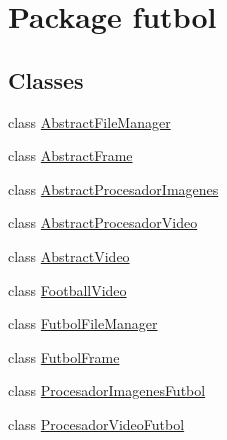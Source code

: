 \hypertarget{namespacefutbol}{}\section{Package futbol}
\label{namespacefutbol}
\subsection*{Classes}
\begin{DoxyCompactItemize}
\item 
class \hyperlink{classfutbol_1_1_abstract_file_manager}{Abstract\+File\+Manager}
\item 
class \hyperlink{classfutbol_1_1_abstract_frame}{Abstract\+Frame}
\item 
class \hyperlink{classfutbol_1_1_abstract_procesador_imagenes}{Abstract\+Procesador\+Imagenes}
\item 
class \hyperlink{classfutbol_1_1_abstract_procesador_video}{Abstract\+Procesador\+Video}
\item 
class \hyperlink{classfutbol_1_1_abstract_video}{Abstract\+Video}
\item 
class \hyperlink{classfutbol_1_1_football_video}{Football\+Video}
\item 
class \hyperlink{classfutbol_1_1_futbol_file_manager}{Futbol\+File\+Manager}
\item 
class \hyperlink{classfutbol_1_1_futbol_frame}{Futbol\+Frame}
\item 
class \hyperlink{classfutbol_1_1_procesador_imagenes_futbol}{Procesador\+Imagenes\+Futbol}
\item 
class \hyperlink{classfutbol_1_1_procesador_video_futbol}{Procesador\+Video\+Futbol}
\end{DoxyCompactItemize}
